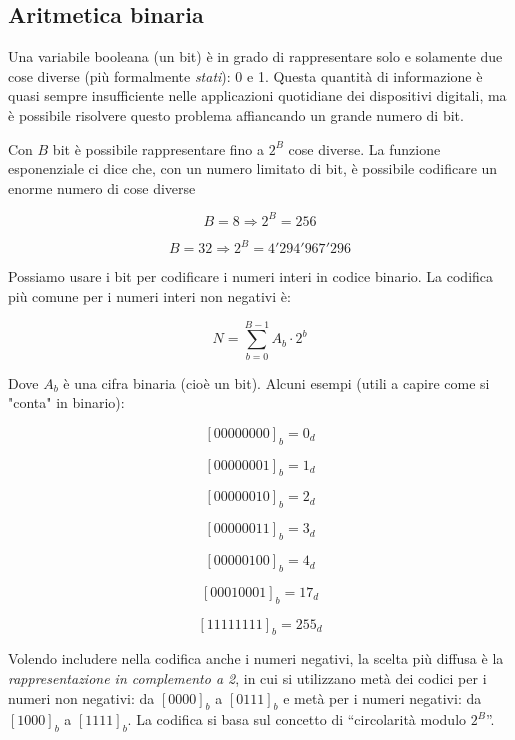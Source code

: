 \documentclass{article}
\begin{document}
\clearpage











\subsection{Aritmetica binaria}

Una variabile booleana (un bit) è in grado di rappresentare solo e solamente due cose diverse (più formalmente \textit{stati}): 0 e 1. Questa quantità di informazione è quasi sempre insufficiente nelle applicazioni quotidiane dei dispositivi digitali, ma è possibile risolvere questo problema affiancando un grande numero di bit.

\vspace{1mm}

Con $B$ bit è possibile rappresentare fino a $2^B$ cose diverse. La funzione esponenziale ci dice che, con un numero limitato di bit, è possibile codificare un enorme numero di cose diverse

\[B = 8 \Rightarrow 2^B = 256\]

\[B = 32 \Rightarrow 2^B = 4'294'967'296\]

Possiamo usare i bit per codificare i numeri interi in codice binario. La codifica più comune per i numeri interi non negativi è:

\[N = \sum^{B - 1}_{b = 0} A_b \cdot 2^b\]

Dove $A_b$ è una cifra binaria (cioè un bit). Alcuni esempi (utili a capire come si "conta" in binario):

\[ [00000000]_b = 0_d\]

\[[00000001]_b = 1_d\]

\[[00000010]_b = 2_d\]

\[[00000011]_b = 3_d\]

\[[00000100]_b = 4_d\]

\[ [00010001]_b = 17_d\]

\[ [11111111]_b = 255_d\]

Volendo includere nella codifica anche i numeri negativi, la scelta più diffusa è la \textit{rappresentazione in complemento a 2}, in cui si utilizzano metà dei codici per i numeri non negativi: da $[0000]_b$ a $[0111]_b$ e metà per i numeri negativi: da $[1000]_b$ a $[1111]_b$. La codifica si basa sul concetto di ``circolarità modulo $2^B$''.

\vspace{3mm}
\end{document}
